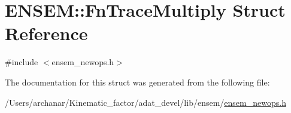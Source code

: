 \hypertarget{structENSEM_1_1FnTraceMultiply}{}\section{E\+N\+S\+EM\+:\+:Fn\+Trace\+Multiply Struct Reference}
\label{structENSEM_1_1FnTraceMultiply}


{\ttfamily \#include $<$ensem\+\_\+newops.\+h$>$}



The documentation for this struct was generated from the following file\+:\begin{DoxyCompactItemize}
\item 
/\+Users/archanar/\+Kinematic\+\_\+factor/adat\+\_\+devel/lib/ensem/\mbox{\hyperlink{lib_2ensem_2ensem__newops_8h}{ensem\+\_\+newops.\+h}}\end{DoxyCompactItemize}
